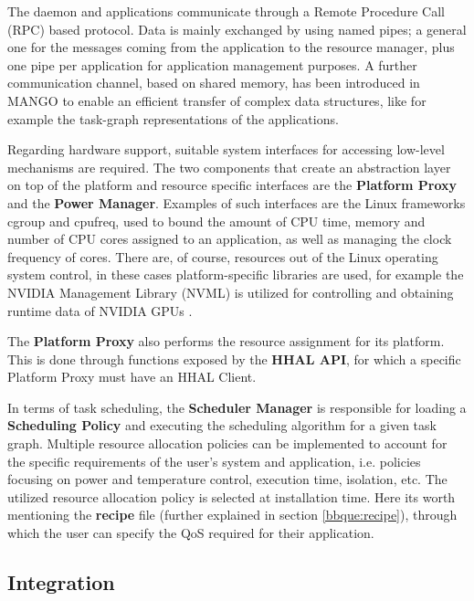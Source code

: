 The daemon and applications communicate through a Remote Procedure Call (RPC) based protocol. Data is mainly exchanged by using named pipes; a general one for the messages coming from the application to the resource manager, plus one pipe per application for application management purposes. A further communication channel, based on shared memory, has been introduced in MANGO to enable an efficient transfer of complex data structures, like for example the task-graph representations of the applications. 

Regarding hardware support, suitable system interfaces for accessing low-level mechanisms are required. The two components that create an abstraction layer on top of the platform and resource specific interfaces are the \textbf{Platform Proxy} and the \textbf{Power Manager}. Examples of such interfaces are the Linux frameworks cgroup and cpufreq, used to bound the amount of CPU time, memory and number of CPU cores assigned to an application, as well as managing the clock frequency of cores.
There are, of course, resources out of the Linux operating system control, in these cases platform-specific libraries are used, for example the NVIDIA Management Library (NVML) \cite{nvml} is utilized for controlling and obtaining runtime data of NVIDIA GPUs \cite{mango_exploring_manycore_architectures}.

The \textbf{Platform Proxy} also performs the resource assignment for its platform. This is done through functions exposed by the \textbf{HHAL API}, for which a specific Platform Proxy must have an HHAL Client.

In terms of task scheduling, the \textbf{Scheduler Manager} is responsible for loading a \textbf{Scheduling Policy} and executing the scheduling algorithm for a given task graph. Multiple resource allocation policies can be implemented to account for the specific requirements of the user's system and application, i.e. policies focusing on power and temperature control, execution time, isolation\cite{mango_exploring_manycore_architectures}, etc. The utilized resource allocation policy is selected at installation time. 
Here its worth mentioning the \textbf{recipe} file (further explained in section \ref{bbque:recipe}), through which the user can specify the QoS required for their application.

\subsection{Integration} \label{bbque:integration}

